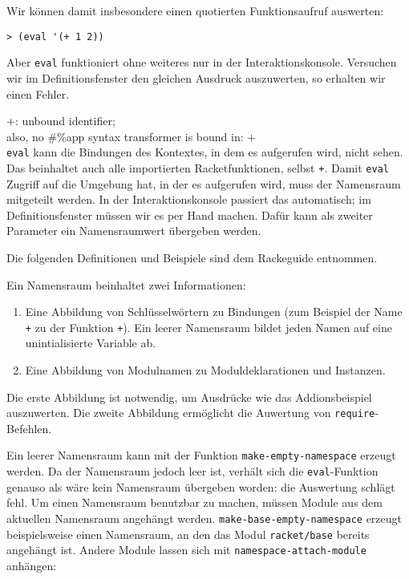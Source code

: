 Wir können damit insbesondere einen quotierten Funktionsaufruf auswerten:

\begin{lstlisting}
> (eval '(+ 1 2))
\end{lstlisting}
{}

Aber \texttt{eval} funktioniert ohne weiteres nur in der Interaktionskonsole. Versuchen wir im Definitionsfenster den gleichen Ausdruck auszuwerten, so erhalten wir einen Fehler.

{\color{red}\ttfamily\small\hspace{5pt} +: unbound identifier;}\\
{\color{red}\ttfamily\small\hspace{5pt} also, no \#\%app syntax transformer is bound in: +}\\

\texttt{eval} kann die Bindungen des Kontextes, in dem es aufgerufen wird, nicht sehen. Das beinhaltet auch alle importierten Racketfunktionen, selbst \texttt{+}. Damit \texttt{eval} Zugriff auf die Umgebung hat, in der es aufgerufen wird, muss der Namensraum mitgeteilt werden. In der Interaktionskonsole passiert das automatisch; im Definitionsfenster müssen wir es per Hand machen. Dafür kann als zweiter Parameter ein Namensraumwert übergeben werden. 

Die folgenden Definitionen und Beispiele sind dem Rackeguide \cite{racketguide-namespace} entnommen.

Ein Namensraum beinhaltet zwei Informationen:
\begin{enumerate}
 \item Eine Abbildung von Schlüsselwörtern zu Bindungen (zum Beispiel der Name \texttt{+} zu der Funktion \texttt{+}). Ein leerer Namensraum bildet jeden Namen auf eine unintialisierte Variable ab.
 \item Eine Abbildung von Modulnamen zu Moduldeklarationen und Instanzen.
\end{enumerate}

Die erste Abbildung ist notwendig, um Ausdrücke wie das Addionsbeispiel auszuwerten. Die zweite Abbildung ermöglicht die Auwertung von \texttt{require}-Befehlen.

Ein leerer Namensraum kann mit der Funktion \texttt{make-empty-namespace} erzeugt werden. Da der Namensraum jedoch leer ist, verhält sich die \texttt{eval}-Funktion genauso als wäre kein Namensraum übergeben worden: die Auswertung schlägt fehl. Um einen Namensraum benutzbar zu machen, müssen Module aus dem aktuellen Namensraum angehängt werden. \texttt{make-base-empty-namespace} erzeugt beispielsweise einen Namensraum, an den das Modul \texttt{racket/base} bereits angehängt ist. Andere Module lassen sich mit \texttt{namespace-attach-module} anhängen:

